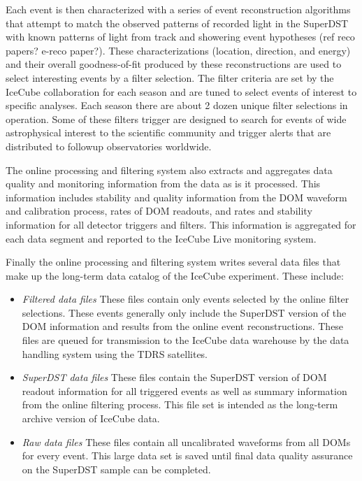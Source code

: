 Each event is then characterized with a series of event reconstruction algorithms that attempt to match
the observed patterns of recorded light in the SuperDST with known patterns of light
from track and showering event hypotheses (ref reco papers?  e-reco paper?).  These characterizations (location, direction, and energy) and their 
overall goodness-of-fit produced by these reconstructions are used to select interesting 
events by a filter selection.  The filter criteria are set by the IceCube collaboration for each season
and are tuned to select events of interest to specific analyses.  Each season there are
about 2 dozen unique filter selections in operation.  Some of these filters trigger are
designed to search for events of wide astrophysical interest to the scientific community and trigger
alerts that are distributed to followup observatories worldwide.

The online processing and filtering system also extracts and aggregates data quality and monitoring information
from the data as is it processed.  This information includes stability and quality information from the
DOM waveform and calibration process, rates of DOM readouts, and rates and stability
information for all detector triggers and filters.  This information is aggregated for each data segment and
reported to the IceCube Live monitoring system.  

Finally the online processing and filtering system writes several data files that make up the long-term data catalog of the IceCube
experiment.  These include:
\begin{itemize}
\item \emph {Filtered data files} These files contain only events selected by the online filter selections.  These events
generally only include the SuperDST version of the DOM information and results from the online event reconstructions.  These
files are queued for transmission to the IceCube data warehouse by the data handling system using the TDRS satellites. 
\item \emph {SuperDST data files} These files contain the SuperDST version of DOM readout information for all triggered events as well as summary
information from the online filtering process.  This file set is intended as the long-term archive version of IceCube data.
\item \emph {Raw data files}  These files contain all uncalibrated waveforms from all DOMs for every event.  This large data
set is saved until final data quality assurance on the SuperDST sample can be completed.
\end{itemize}

